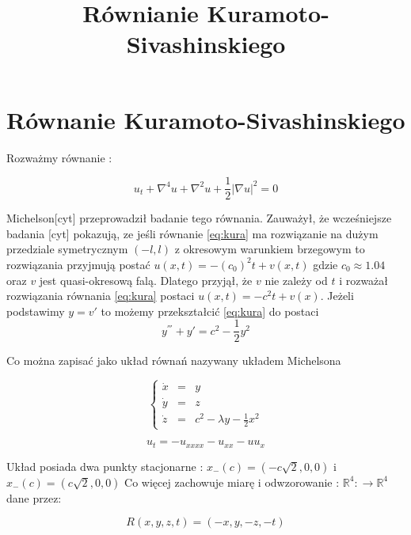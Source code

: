 \title{Równianie Kuramoto-Sivashinskiego}

\section{Równanie Kuramoto-Sivashinskiego}
Rozważmy równanie :


\begin{equation}\label{eq:kura}
  u_t + \nabla^4u + \nabla^2u + \frac{1}{2}| \nabla u|^2 = 0
 \end{equation}

Michelson[cyt] przeprowadził badanie tego równania. Zauważył, że wcześniejsze badania [cyt] pokazują, ze jeśli równanie \ref{eq:kura} 
ma rozwiązanie na dużym przedziale symetrycznym $ (-l,l) $ z okresowym warunkiem brzegowym to rozwiązania przyjmują postać 
$ u(x,t) = -(c_0)^2t + v(x,t) $ gdzie $ c_0 \approx 1.04 $ oraz $ v $ jest quasi-okresową falą. Dlatego przyjął, że $ v $ nie zależy od 
$ t $ i rozważał rozwiązania równania \ref{eq:kura} postaci $ u(x,t) = - c^2t + v(x) $. Jeżeli podstawimy $ y = v'$ to możemy przekształcić \ref{eq:kura}
do postaci 
\begin{equation}
\label{eq:jednazmienna}
  y^{'''} + y' = c^2 - \frac{1}{2}y^2
\end{equation}

Co można zapisać jako układ równań nazywany układem Michelsona

\begin{equation}\label{eq:michealsonSystem}
\left\{
    \begin{array}{rcl}
        \dot x &=& y\\
        \dot y &=& z\\
        \dot z &=& c^2 - \lambda y -\frac{1}{2}x^2
    \end{array}
\right.
\end{equation}



$$
  u_t = -u_{xxxx} - u_{xx} -uu_x
$$


Układ posiada dwa punkty stacjonarne : $x_{-}(c) = (-c\sqrt{2},0,0) $ i $x_{-}(c) = (c\sqrt{2},0,0)$
Co więcej zachowuje miarę i odwzorowanie : $ {\mathbb R} ^4: \to {\mathbb R}^4 $ dane przez:

\begin{equation}
   R(x,y,z,t) = (-x,y,-z,-t)
\end{equation}


